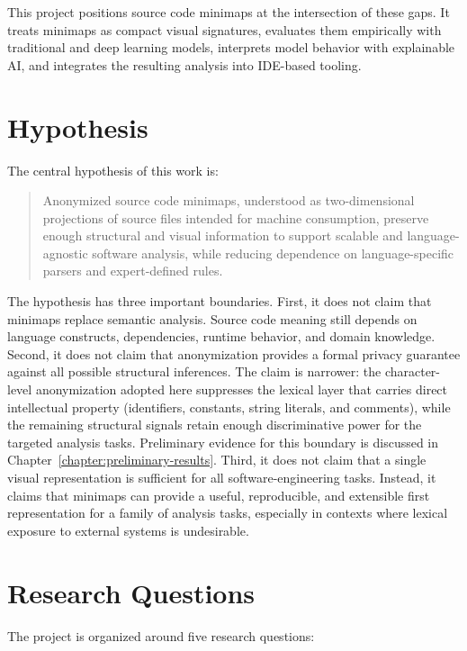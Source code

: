 This project positions source code minimaps at the intersection of these gaps.
It treats minimaps as compact visual signatures, evaluates them empirically with
traditional and deep learning models, interprets model behavior with explainable
AI, and integrates the resulting analysis into IDE-based tooling.

\section{Hypothesis}

The central hypothesis of this work is:

\begin{quote}
Anonymized source code minimaps, understood as two-dimensional projections of
source files intended for machine consumption, preserve enough structural and
visual information to support scalable and language-agnostic software analysis,
while reducing dependence on language-specific parsers and expert-defined
rules.
\end{quote}

The hypothesis has three important boundaries. First, it does not claim that
minimaps replace semantic analysis. Source code meaning still depends on
language constructs, dependencies, runtime behavior, and domain knowledge.
Second, it does not claim that anonymization provides a formal privacy guarantee
against all possible structural inferences. The claim is narrower: the
character-level anonymization adopted here suppresses the lexical layer that
carries direct intellectual property (identifiers, constants, string literals,
and comments), while the remaining structural signals retain enough
discriminative power for the targeted analysis tasks. Preliminary evidence for
this boundary is discussed in Chapter~\ref{chapter:preliminary-results}. Third, it does not claim that a single visual
representation is sufficient for all software-engineering tasks. Instead, it
claims that minimaps can provide a useful, reproducible, and extensible first
representation for a family of analysis tasks, especially in contexts where
lexical exposure to external systems is undesirable.

\section{Research Questions}

The project is organized around five research questions:

